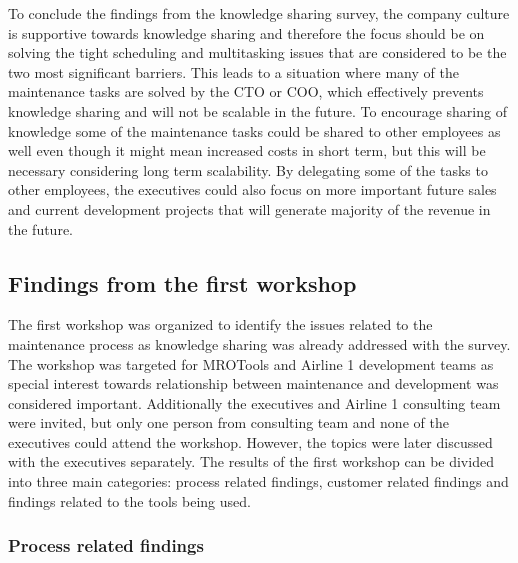 To conclude the findings from the knowledge sharing survey, the company culture is supportive towards knowledge sharing and therefore the focus should be on solving the
tight scheduling and multitasking issues that are considered to be the two most significant barriers. This leads to a situation where many of the maintenance tasks are
solved by the CTO or COO, which effectively prevents knowledge sharing and will not be scalable in the future. To encourage sharing of knowledge some of the maintenance
tasks could be shared to other employees as well even though it might mean increased costs in short term, but this will be necessary considering long term scalability.
By delegating some of the tasks to other employees, the executives could also focus on more important future sales and current development projects that will generate
majority of the revenue in the future.

\subsection{Findings from the first workshop}

The first workshop was organized to identify the issues related to the maintenance process as knowledge sharing was already
addressed with the survey. The workshop was targeted for MROTools and Airline 1 development teams as special interest towards relationship between maintenance and development
was considered important. Additionally the executives and Airline 1 consulting team were invited, but only one person from consulting team and none of the executives
could attend the workshop. However, the topics were later discussed with the executives separately. The results
of the first workshop can be divided into three main categories: process related findings, customer related findings and findings related to the tools being used.

\subsubsection*{Process related findings}

